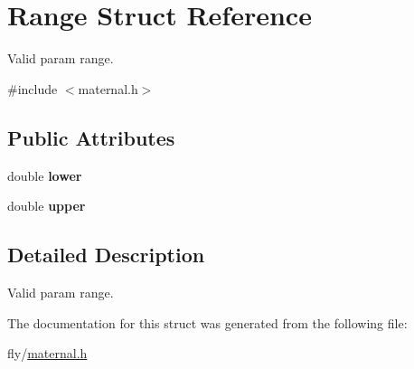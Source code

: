 \hypertarget{structRange}{
\section{Range Struct Reference}
\label{structRange}
}


Valid param range.  


{\ttfamily \#include $<$maternal.h$>$}\subsection*{Public Attributes}
\begin{DoxyCompactItemize}
\item 
\hypertarget{structRange_a9a05bbf9f4d678d8bc9634f0296618df}{
double {\bfseries lower}}
\label{structRange_a9a05bbf9f4d678d8bc9634f0296618df}

\item 
\hypertarget{structRange_a76d1e867c4e3aa706c6b72fe66335d00}{
double {\bfseries upper}}
\label{structRange_a76d1e867c4e3aa706c6b72fe66335d00}

\end{DoxyCompactItemize}


\subsection{Detailed Description}
Valid param range. 

The documentation for this struct was generated from the following file:\begin{DoxyCompactItemize}
\item 
fly/\hyperlink{maternal_8h}{maternal.h}\end{DoxyCompactItemize}
